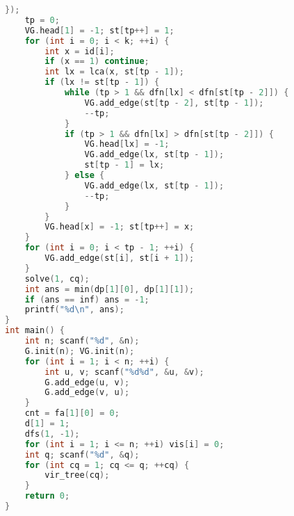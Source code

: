 \begin{lstlisting}[language=C++]
    });
    tp = 0;
    VG.head[1] = -1; st[tp++] = 1;
    for (int i = 0; i < k; ++i) {
        int x = id[i];
        if (x == 1) continue;
        int lx = lca(x, st[tp - 1]);
        if (lx != st[tp - 1]) {
            while (tp > 1 && dfn[lx] < dfn[st[tp - 2]]) {
                VG.add_edge(st[tp - 2], st[tp - 1]);
                --tp;
            }
            if (tp > 1 && dfn[lx] > dfn[st[tp - 2]]) {
                VG.head[lx] = -1;
                VG.add_edge(lx, st[tp - 1]);
                st[tp - 1] = lx;
            } else {
                VG.add_edge(lx, st[tp - 1]);
                --tp;
            }
        }
        VG.head[x] = -1; st[tp++] = x;
    }
    for (int i = 0; i < tp - 1; ++i) {
        VG.add_edge(st[i], st[i + 1]);
    }
    solve(1, cq);
    int ans = min(dp[1][0], dp[1][1]);
    if (ans == inf) ans = -1;
    printf("%d\n", ans);
}
int main() {
    int n; scanf("%d", &n);
    G.init(n); VG.init(n);
    for (int i = 1; i < n; ++i) {
        int u, v; scanf("%d%d", &u, &v);
        G.add_edge(u, v);
        G.add_edge(v, u);
    }
    cnt = fa[1][0] = 0;
    d[1] = 1;
    dfs(1, -1);
    for (int i = 1; i <= n; ++i) vis[i] = 0;
    int q; scanf("%d", &q);
    for (int cq = 1; cq <= q; ++cq) {
        vir_tree(cq);
    }
    return 0;
}
\end{lstlisting}